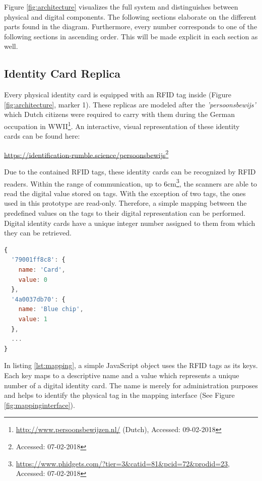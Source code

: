Figure \ref{fig:architecture} visualizes the full system and distinguishes between physical and digital components.
The following sections elaborate on the different parts found in the diagram.
Furthermore, every number corresponds to one of the following sections in ascending order.
This will be made explicit in each section as well.


\subsection{Identity Card Replica} \label{sec:idcardreplica}
Every physical identity card is equipped with an RFID tag inside (Figure \ref{fig:architecture}, marker 1).
These replicas are modeled after the \textit{'persoonsbewijs'} which Dutch citizens were required to carry with them during the German occupation in WWII\footnote{\url{http://www.persoonsbewijzen.nl/} (Dutch), Accessed: 09-02-2018}.
An interactive, visual representation of these identity cards can be found here:

\begin{flushleft}
  \url{https://identification-rumble.science/persoonsbewijs}\footnote{Accessed: 07-02-2018}
\end{flushleft}

Due to the contained RFID tags, these identity cards can be recognized by RFID readers.
Within the range of communication, up to 6cm\footnote{\url{https://www.phidgets.com/?tier=3&catid=81&pcid=72&prodid=23}, Accessed: 07-02-2018}, the scanners are able to read the digital value stored on tags.
With the exception of two tags, the ones used in this prototype are read-only.
Therefore, a simple mapping between the predefined values on the tags to their digital representation can be performed.
Digital identity cards have a unique integer number assigned to them from which they can be retrieved.

\begin{lstlisting}[caption={JavaScript mapping for RFID tags}, label={lst:mapping}, language=JavaScript]
{
  '79001ff8c8': {
    name: 'Card',
    value: 0
  },
  '4a0037db70': {
    name: 'Blue chip',
    value: 1
  },
  ...
}
\end{lstlisting}

In listing \ref{lst:mapping}, a simple JavaScript object uses the RFID tags as its keys.
Each key maps to a descriptive name and a value which represents a unique number of a digital identity card.
The name is merely for administration purposes and helps to identify the physical tag in the mapping interface (See Figure \ref{fig:mappinginterface}).

